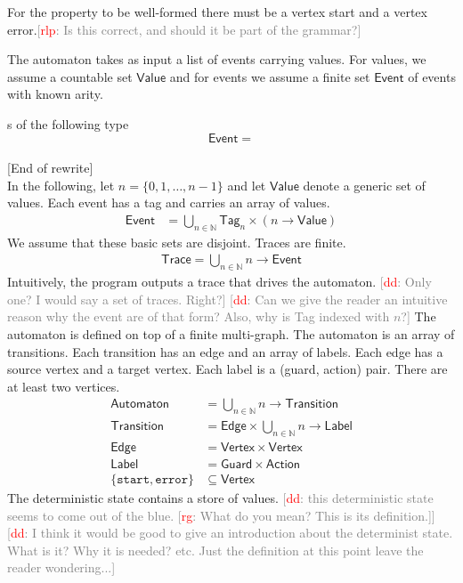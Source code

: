 \documentclass[preprint]{sigplanconf} %
\newcommand{\note}[2]{\textcolor{gray}{[\textcolor{red}{#1}: #2]}}
\newcommand{\rg}[1]{\note{rg}{#1}}
\newcommand{\rlp}[1]{\note{rlp}{#1}}
\newcommand{\dd}[1]{\note{dd}{#1}}
\newcommand{\dinocomment}[1]{\dd{#1}}
\newcommand{\N}{\ensuremath{\mathbb{N}}}
\newcommand{\set}[1]{\ensuremath{\mathsf{#1}}}
\theoremstyle{definition}
\theoremstyle{remark}
\begin{document}
For the property to be well-formed there must be a vertex start and a
vertex error.\rlp{Is this correct, and should it be part of the grammar?}

The automaton takes as input a list of events carrying values. For
values, we assume a countable set \set{Value} and for events we assume
a finite set \set{Event} of events with known arity.

s of the following type
\[
\set{Event} = 
\]
\ \\ {}[End of rewrite]\\



In the following, let $n=\{0,1,\ldots,n-1\}$ and let \set{Value} denote a generic set of values.
Each event has a tag and carries an array of values.
\begin{align}
\set{Event}&=\bigcup_{n\in\N}\set{Tag}_n\times(n\to\set{Value})
\end{align}
We assume that these basic sets are disjoint.
Traces are finite.
\begin{align}
\set{Trace}=\bigcup_{n\in\N} n\to\set{Event} \label{eq:trace}
\end{align}
Intuitively, the program outputs a trace that drives the automaton.
\dinocomment{Only one? I would say a set of traces. Right?}
\dinocomment{Can we give the reader an intuitive reason why the event are of that form? Also, why is Tag indexed with $n$?}
The automaton is defined on top of a finite multi-graph.
The automaton is an array of transitions.
Each transition has an edge and an array of labels.
Each edge has a source vertex and a target vertex.
Each label is a (guard, action) pair.
There are at least two vertices.
\begin{align}
\set{Automaton} &= \bigcup_{n\in\N} n \to \set{Transition} \\
\set{Transition} &= \set{Edge}\times \bigcup_{n\in\N} n\to\set{Label} \\
\set{Edge}&=\set{Vertex}\times\set{Vertex} \\
\set{Label}&=\set{Guard}\times\set{Action} \\
\{\mathtt{start},\mathtt{error}\}&\subseteq\set{Vertex}
\end{align}
The deterministic state contains a store of values.
\dinocomment{this deterministic state seems to come out of the blue.
\rg{What do you mean?
This is its definition.}}
\dinocomment{I think it would be good to give an introduction about the determinist state. What is it? Why it is needed?
etc. Just the definition at this point leave the reader wondering...}
\end{document}
